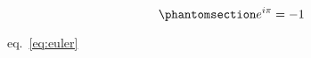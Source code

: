 \begin{equation}\protect\phantomsection\label{eq:euler}{e^{i\pi} = -1}\end{equation}

eq.~\ref{eq:euler}
